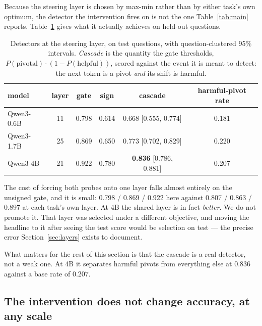 \documentclass{article}
\begin{document}
Because the steering layer is chosen by max-min rather than by either
task's own optimum, the detector the intervention fires on is not the one
Table~\ref{tab:main} reports. Table~\ref{tab:gate} gives what it actually
achieves on held-out questions.

\begin{table}[t]
\centering
\caption{Detectors at the steering layer, on test questions, with
question-clustered 95\% intervals. \emph{Cascade} is the quantity the gate
thresholds, $P(\text{pivotal}) \cdot (1 - P(\text{helpful}))$, scored
against the event it is meant to detect: the next token is a pivot
\emph{and} its shift is harmful.}
\label{tab:gate}
\begin{tabular}{lccccc}
\toprule
model & layer & gate & sign & cascade & harmful-pivot rate \\
\midrule
Qwen3-0.6B & 11 & 0.798 & 0.614 & 0.668 [0.555, 0.774] & 0.181 \\
Qwen3-1.7B & 25 & 0.869 & 0.650 & 0.773 [0.702, 0.829] & 0.220 \\
Qwen3-4B   & 21 & 0.922 & 0.780 & \textbf{0.836} [0.786, 0.881] & 0.207 \\
\bottomrule
\end{tabular}
\end{table}

The cost of forcing both probes onto one layer falls almost entirely on
the unsigned gate, and it is small: 0.798 / 0.869 / 0.922 here against
0.807 / 0.863 / 0.897 at each task's own layer. At 4B the shared layer is
in fact \emph{better}. We do not promote it. That layer was selected under
a different objective, and moving the headline to it after seeing the test
score would be selection on test --- the precise error
Section~\ref{sec:layers} exists to document.

What matters for the rest of this section is that the cascade is a real
detector, not a weak one. At 4B it separates harmful pivots from
everything else at 0.836 against a base rate of 0.207.

\subsection{The intervention does not change accuracy, at any scale}
\label{sec:causalresult}
\end{document}
